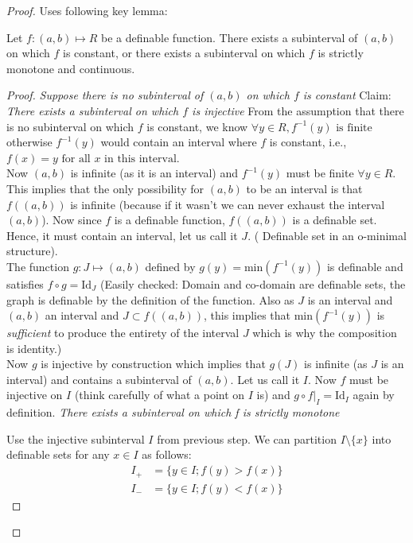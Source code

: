 \begin{proof}
    Uses following key lemma:
    \begin{lemma}
    \label{monotone-lemma}
        Let $f: (a, b)\mapsto R$ be a definable function. There exists a subinterval of $(a,b)$ on which $f$ is constant, or there exists a subinterval on which $f$ is strictly monotone and continuous.
    \end{lemma}
    \begin{proof}
        \textit{Suppose there is no subinterval of $(a, b)$ on which $f$ is constant}
        Claim: \textit{There exists a subinterval on which $f$ is injective}
        From the assumption that there is no subinterval on which $f$ is constant, we know $\forall y\in R, f^{-1}(y) \text{ is finite}$ otherwise $f^{-1}(y)$ would contain an interval where $f$ is constant, i.e., $f(x) = y \text{ for all $x$ in this interval}$.\\ Now $(a, b)$ is infinite (as it is an interval) and $f^{-1}(y)$ must be finite $\forall y \in R$. This implies that the only possibility for $(a,b)$ to be an interval is that $f((a,b))$ is infinite (because if it wasn't we can never exhaust the interval $(a,b)$). Now since $f$ is a definable function, $f((a,b))$ is a definable set. Hence, it must contain an interval, let us call it $J$. ( Definable set in an o-minimal structure).\\ The function $g: J\mapsto(a, b)$ defined by $g(y) = \text{min}(f^{-1}(y))$ is definable and satisfies $f \circ g = \text{Id}_J$ (Easily checked: Domain and co-domain are definable sets, the graph is definable by the definition of the function. Also as $J$ is an interval and $(a, b)$ an interval and $J\subset f((a,b))$, this implies that $\text{min}(f^{-1}(y))$ is \textit{ sufficient} to produce the entirety of the interval $J$ which is why the composition is identity.)\\ Now $g$ is injective by construction which implies that $g(J)$ is infinite (as $J$ is an interval) and contains a subinterval of $(a,b)$. Let us call it $I$. Now $f$ must be injective on $I$ (think carefully of what a point on $I$ is) and $g \circ f|_I = \text{Id}_I$ again by definition.
        \textit{There exists a subinterval on which f is strictly monotone}
        
        Use the injective subinterval $I$ from previous step. We can partition $I \setminus \{x\}$ into definable sets for any $x\in I$ as follows:
        \begin{align*}
            I_+ &= \{y\in I; f(y) > f(x)\} \\
            I_- &= \{y\in I; f(y) < f(x)\}
        \end{align*}


\end{proof}
\end{proof}
